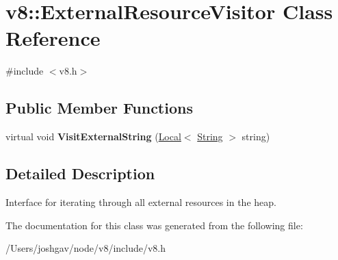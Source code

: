\hypertarget{classv8_1_1_external_resource_visitor}{}\section{v8\+:\+:External\+Resource\+Visitor Class Reference}
\label{classv8_1_1_external_resource_visitor}


{\ttfamily \#include $<$v8.\+h$>$}

\subsection*{Public Member Functions}
\begin{DoxyCompactItemize}
\item 
virtual void {\bfseries Visit\+External\+String} (\hyperlink{classv8_1_1_local}{Local}$<$ \hyperlink{classv8_1_1_string}{String} $>$ string)\hypertarget{classv8_1_1_external_resource_visitor_ad611b1b6a06753f8eaf6936f793441bd}{}\label{classv8_1_1_external_resource_visitor_ad611b1b6a06753f8eaf6936f793441bd}

\end{DoxyCompactItemize}


\subsection{Detailed Description}
Interface for iterating through all external resources in the heap. 

The documentation for this class was generated from the following file\+:\begin{DoxyCompactItemize}
\item 
/\+Users/joshgav/node/v8/include/v8.\+h\end{DoxyCompactItemize}
